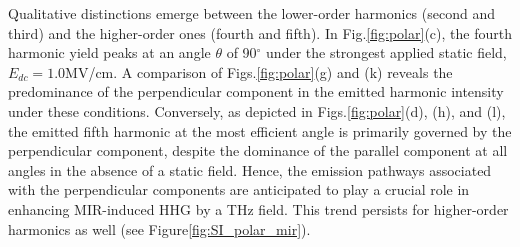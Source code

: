 Qualitative distinctions emerge between the lower-order harmonics (second and third) and the
higher-order ones (fourth and fifth). In Fig.\ref{fig:polar}(c), the fourth harmonic yield peaks at
an angle $\theta$ of 90$^{\circ}$ under the strongest applied static field, $E_{dc}=1.0$MV/cm. A
comparison of Figs.\ref{fig:polar}(g) and (k) reveals the predominance of the perpendicular
component in the emitted harmonic intensity under these conditions. Conversely, as depicted in
Figs.\ref{fig:polar}(d), (h), and (l), the emitted fifth harmonic at the most efficient angle is
primarily governed by the perpendicular component, despite the dominance of the parallel component
at all angles in the absence of a static field. Hence, the emission pathways associated with the
perpendicular components are anticipated to play a crucial role in enhancing MIR-induced HHG by a
THz field. This trend persists for higher-order harmonics as well (see Figure\ref{fig:SI_polar_mir}).
